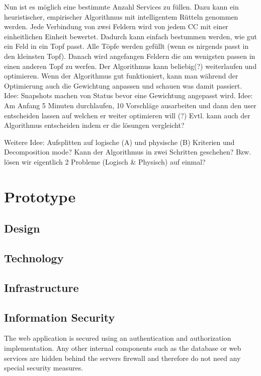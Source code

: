 Nun ist es möglich eine bestimmte Anzahl Services zu füllen. Dazu kann ein heuristischer, empirischer Algorithmus mit intelligentem Rütteln genommen werden. 
Jede Verbindung von zwei Feldern wird von jedem CC mit einer einheitlichen Einheit bewertet. Dadurch kann einfach bestummen werden, wie gut ein Feld in ein Topf passt. Alle Töpfe werden gefüllt (wenn es nirgends passt in den kleinsten Topf). Danach wird angefangen Feldern die am wenigsten passen in einen anderen Topf zu werfen.
Der Algorithmus kann beliebig(?) weiterlaufen und optimieren. Wenn der Algorithmus gut funktioniert, kann man während der Optimierung auch die Gewichtung anpassen und schauen was damit passiert.
Idee: Snapshots machen von Status bevor eine Gewichtung angepasst wird.
Idee: Am Anfang 5 Minuten durchlaufen, 10 Vorschläge ausarbeiten und dann den user entscheiden lassen auf welchen er weiter optimieren will (?) Evtl. kann auch der Algorithmus entscheiden indem er die lösungen vergleicht? 

Weitere Idee: Aufsplitten auf logische (A) und physische (B) Kriterien und Decomposition mode? Kann der Algorithmus in zwei Schritten geschehen? Bzw. lösen wir eigentlich 2 Probleme (Logisch \& Physisch) auf einmal?

\section{Prototype} 

\subsection{Design}

\subsection{Technology}

\subsection{Infrastructure}

\subsection{Information Security}

The web application is secured using an authentication and authorization implementation. Any other internal components such as the database or web services are hidden behind the servers firewall and therefore do not need any special security measures.

